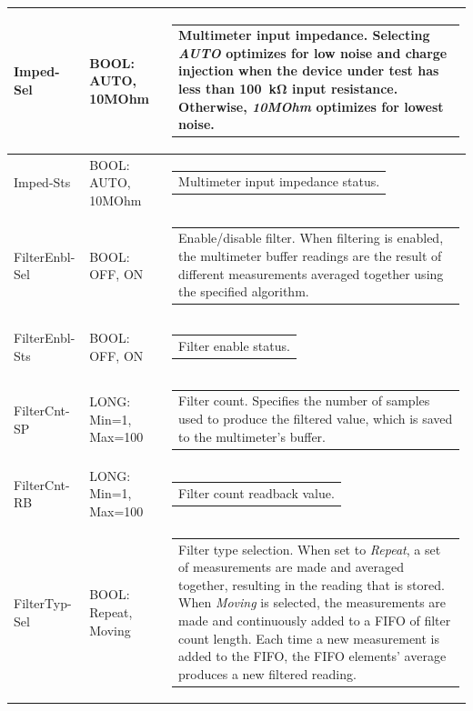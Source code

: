 \documentclass[openany]{article}
\begin{document}
\begin{longtable}{| m{3.0cm} m{4.5cm} m{7.0cm} |}
		Imped-Sel & BOOL: AUTO, 10MOhm & \begin{tabular}{@{}m{6cm}@{}}
	    					Multimeter input impedance. Selecting \emph{AUTO} optimizes for low noise and charge injection when the device under test has less than \SI{100}{\kohm} input resistance. Otherwise, \emph{10MOhm} optimizes for lowest noise.
						\end{tabular} \\ \hline
		Imped-Sts & BOOL: AUTO, 10MOhm & \begin{tabular}{@{}m{6cm}@{}}
	    					Multimeter input impedance status.
						\end{tabular} \\ \hline
		FilterEnbl-Sel & BOOL: OFF, ON & \begin{tabular}{@{}m{6cm}@{}}
	    					Enable/disable filter. When filtering is enabled, the multimeter buffer readings are the result of different measurements averaged together using the specified algorithm.
						\end{tabular} \\ \hline
		FilterEnbl-Sts & BOOL: OFF, ON & \begin{tabular}{@{}m{6cm}@{}}
	    					Filter enable status.
						\end{tabular} \\ \hline
		FilterCnt-SP & LONG: Min=1, Max=100 & \begin{tabular}{@{}m{6cm}@{}}
	    					Filter count. Specifies the number of samples used to produce the filtered value, which is saved to the multimeter's buffer.
						\end{tabular} \\ \hline
		FilterCnt-RB & LONG: Min=1, Max=100 & \begin{tabular}{@{}m{6cm}@{}}
	    					Filter count readback value.
						\end{tabular} \\ \hline
		FilterTyp-Sel & BOOL: Repeat, Moving & \begin{tabular}{@{}m{6cm}@{}}
	    					Filter type selection. When set to \emph{Repeat}, a set of measurements are made and averaged together, resulting in the reading that is stored. When \emph{Moving} is selected, the measurements are made and continuously added to a FIFO of filter count length. Each time a new measurement is added to the FIFO, the FIFO elements' average produces a new filtered reading.
						\end{tabular} \\ \hline

\end{longtable}
\end{document}
